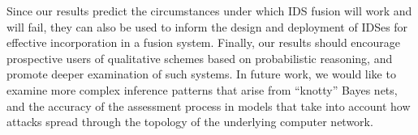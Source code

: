 Since our results predict the circumstances under which IDS fusion will work and
will fail, they can also be used to inform the design and deployment of IDSes
for effective incorporation in a fusion system.
Finally, our results should encourage prospective users
of qualitative schemes based on probabilistic reasoning,
and promote deeper examination of %
such systems.
In future work, we would like to examine more complex inference patterns that
arise from ``knotty'' Bayes nets, and the accuracy of the assessment process in
models that take into account how attacks spread through the topology of the underlying computer network.


